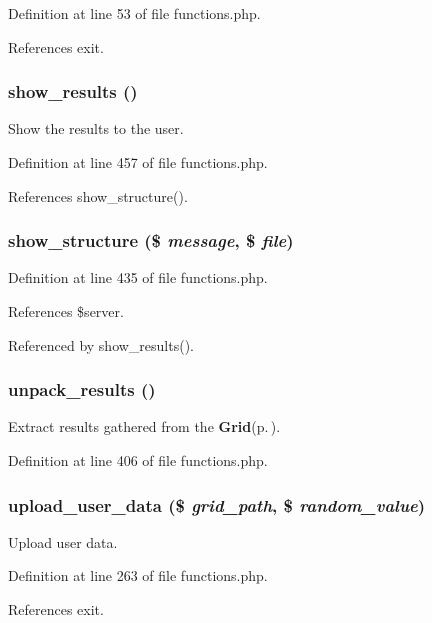 Definition at line 53 of file functions.php.

References exit.
\subsubsection{\setlength{\rightskip}{0pt plus 5cm}show\_\-results ()}\label{functions_8php_a12}


Show the results to the user. 



Definition at line 457 of file functions.php.

References show\_\-structure().
\subsubsection{\setlength{\rightskip}{0pt plus 5cm}show\_\-structure (\$ {\em message}, \$ {\em file})}\label{functions_8php_a11}




Definition at line 435 of file functions.php.

References \$server.

Referenced by show\_\-results().
\subsubsection{\setlength{\rightskip}{0pt plus 5cm}unpack\_\-results ()}\label{functions_8php_a10}


Extract results gathered from the {\bf Grid}{\rm (p.\,\pageref{classGrid})}. 



Definition at line 406 of file functions.php.
\subsubsection{\setlength{\rightskip}{0pt plus 5cm}upload\_\-user\_\-data (\$ {\em grid\_\-path}, \$ {\em random\_\-value})}\label{functions_8php_a7}


Upload user data. 



Definition at line 263 of file functions.php.

References exit.
